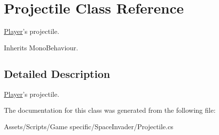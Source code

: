 \hypertarget{class_projectile}{\section{Projectile Class Reference}
\label{class_projectile}
}


\hyperlink{class_player}{Player}'s projectile. 




Inherits Mono\-Behaviour.



\subsection{Detailed Description}
\hyperlink{class_player}{Player}'s projectile.



The documentation for this class was generated from the following file\-:\begin{DoxyCompactItemize}
\item 
Assets/\-Scripts/\-Game specific/\-Space\-Invader/Projectile.\-cs\end{DoxyCompactItemize}
